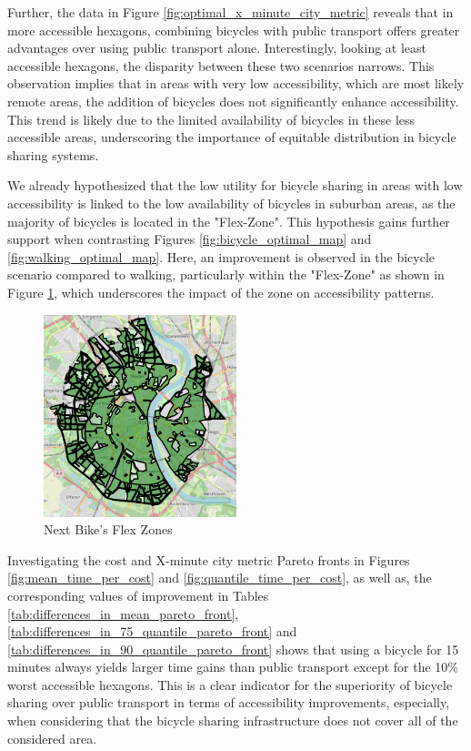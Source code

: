 Further, the data in Figure \ref{fig:optimal_x_minute_city_metric} reveals that in more accessible hexagons, combining bicycles with public transport offers greater advantages over using public transport alone. 
Interestingly, looking at least accessible hexagons, the disparity between these two scenarios narrows. 
This observation implies that in areas with very low accessibility, which are most likely remote areas, the addition of bicycles does not significantly enhance accessibility.
This trend is likely due to the limited availability of bicycles in these less accessible areas, underscoring the importance of equitable distribution in bicycle sharing systems.

We already hypothesized that the low utility for bicycle sharing in areas with low accessibility is linked to the low availability of bicycles in suburban areas, as the majority of bicycles is located in the "Flex-Zone".
This hypothesis gains further support when contrasting Figures \ref{fig:bicycle_optimal_map} and \ref{fig:walking_optimal_map}. 
Here, an improvement is observed in the bicycle scenario compared to walking, particularly within the "Flex-Zone" as shown in Figure \ref{fig:flex_zones}, which underscores the impact of the zone on accessibility patterns.

\begin{figure}
  \begin{center}
    \includegraphics[width=0.50\textwidth]{Figures/discussion/flex_zones.png}
  \end{center}
  \caption{Next Bike's Flex Zones}
  \label{fig:flex_zones}
\end{figure}

Investigating the cost and X-minute city metric Pareto fronts in Figures \ref{fig:mean_time_per_cost} and \ref{fig:quantile_time_per_cost}, as well as, the corresponding values of improvement in Tables \ref{tab:differences_in_mean_pareto_front}, \ref{tab:differences_in_75_quantile_pareto_front} and \ref{tab:differences_in_90_quantile_pareto_front} shows that using a bicycle for 15 minutes always yields larger time gains than public transport except for the 10\% worst accessible hexagons.
This is a clear indicator for the superiority of bicycle sharing over public transport in terms of accessibility improvements, especially, when considering that the bicycle sharing infrastructure does not cover all of the considered area.


